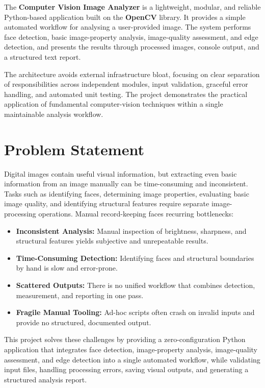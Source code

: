 \documentclass[11pt,a4paper]{article}
\begin{document}
The \textbf{Computer Vision Image Analyzer} is a lightweight, modular, and reliable Python-based application built on the \textbf{OpenCV} library. It provides a simple automated workflow for analysing a user-provided image. The system performs face detection, basic image-property analysis, image-quality assessment, and edge detection, and presents the results through processed images, console output, and a structured text report.

The architecture avoids external infrastructure bloat, focusing on clear separation of responsibilities across independent modules, input validation, graceful error handling, and automated unit testing. The project demonstrates the practical application of fundamental computer-vision techniques within a single maintainable analysis workflow.

\section{Problem Statement}
Digital images contain useful visual information, but extracting even basic information from an image manually can be time-consuming and inconsistent. Tasks such as identifying faces, determining image properties, evaluating basic image quality, and identifying structural features require separate image-processing operations. Manual record-keeping faces recurring bottlenecks:
\begin{itemize}[leftmargin=1.5em]
    \item \textbf{Inconsistent Analysis:} Manual inspection of brightness, sharpness, and structural features yields subjective and unrepeatable results.
    \item \textbf{Time-Consuming Detection:} Identifying faces and structural boundaries by hand is slow and error-prone.
    \item \textbf{Scattered Outputs:} There is no unified workflow that combines detection, measurement, and reporting in one pass.
    \item \textbf{Fragile Manual Tooling:} Ad-hoc scripts often crash on invalid inputs and provide no structured, documented output.
\end{itemize}
This project solves these challenges by providing a zero-configuration Python application that integrates face detection, image-property analysis, image-quality assessment, and edge detection into a single automated workflow, while validating input files, handling processing errors, saving visual outputs, and generating a structured analysis report.
\end{document}
